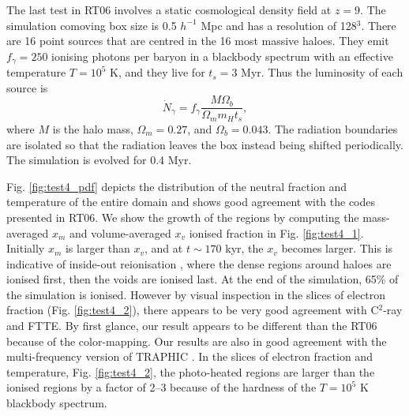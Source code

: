 \documentclass[useAMS,usenatbib]{mn2e}
\begin{document}
\begin{figure*}
  \caption{\label{fig:test4_2} Test 4. (Multiple cosmological
    sources).  Top: Slices through the origin of neutral fraction at
    50 and 200 kyr at the coordinate $z = z_{\rm box}/2$.  Bottom:
    Slices of temperature at 50 and 200 kyr.  No smoothing has been
    applied to the images.}
\end{figure*}

The last test in RT06 involves a static cosmological density field at
$z=9$.  The simulation comoving box size is 0.5 $h^{-1}$ Mpc and has a
resolution of 128$^3$.  There are 16 point sources that are centred
in the 16 most massive haloes.  They emit $f_\gamma = 250$ ionising
photons per baryon in a blackbody spectrum with an effective
temperature $T = 10^5$ K, and they live for $t_s = 3$ Myr.  Thus the
luminosity of each source is
%
\begin{equation}
  \label{eqn:cosmo_lum}
  \dot{N}_\gamma = f_\gamma \frac{M \Omega_b} {\Omega_m m_H t_s},
\end{equation}
where $M$ is the halo mass, $\Omega_m = 0.27$, and $\Omega_b =
0.043$.  The radiation boundaries are isolated so that the radiation
leaves the box instead being shifted periodically.  The simulation is
evolved for 0.4 Myr.

Fig. \ref{fig:test4_pdf} depicts the distribution of the neutral
fraction and temperature of the entire domain and shows good agreement
with the codes presented in RT06.  We show the growth of the \hii
regions by computing the mass-averaged $x_m$ and volume-averaged $x_v$
ionised fraction in Fig. \ref{fig:test4_1}.  Initially $x_m$ is larger
than $x_v$, and at $t \sim 170$ kyr, the $x_v$ becomes larger.  This
is indicative of inside-out reionisation \citep[e.g.][]{Gnedin00,
  Miralda00, Sokasian03}, where the dense regions around haloes are
ionised first, then the voids are ionised last.  At the end of the
simulation, 65\% of the simulation is ionised.  However by visual
inspection in the slices of electron fraction
(Fig. \ref{fig:test4_2}), there appears to be very good agreement with
C$^2$-ray and FTTE.  By first glance, our result appears to be
different than the RT06 because of the color-mapping.  Our results are
also in good agreement with the multi-frequency version of TRAPHIC
\citep[][see also for better representations of the electron fraction
slices]{Pawlik10}.  In the slices of electron fraction and
temperature, Fig. \ref{fig:test4_2}, the photo-heated regions are
larger than the ionised regions by a factor of 2--3 because of the
hardness of the $T = 10^5$ K blackbody spectrum.
\end{document}
